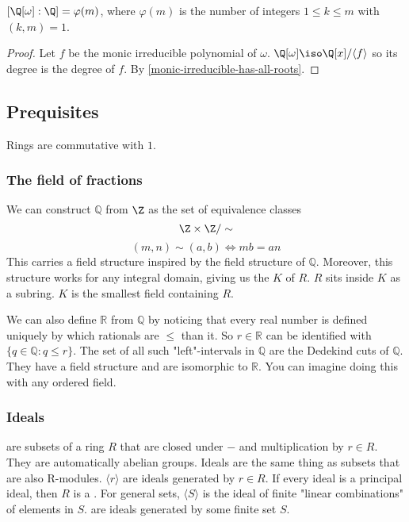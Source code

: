 \begin{corollary}\label{Q[w]-degree}
$[\Q[\omega]:\Q]=\varphi(m)$, where $\varphi(m)$ is the number of integers $1\leq k\leq m$ with $(k,m)=1$.
\end{corollary}

\begin{proof} Let $f$ be the monic irreducible polynomial of $\omega$. $\Q[\omega]\iso \Q[x]/\langle f \rangle$ so its degree is the degree of $f$. By \cref{monic-irreducible-has-all-roots}.
\end{proof}

\subsection{Prequisites}
Rings are commutative with $1$.
\subsubsection{The field of fractions}
We can construct $\mathbb{Q}$ from $\Z$ as the set of equivalence classes $$\Z\times\Z / \sim $$
$$(m,n)\sim (a,b)\iff mb=an$$
This carries a field structure inspired by the field structure of $\mathbb{Q}$. Moreover, this structure works for any integral domain, giving us the  $K$ of $R$. $R$ sits inside $K$ as a subring. $K$ is the smallest field containing $R$.

We can also define $\mathbb{R}$ from $\mathbb{Q}$ by noticing that every real number is defined uniquely by which rationals are $\leq$ than it. So $r\in \mathbb{R}$ can be identified with $\{q\in \mathbb{Q}:q\leq r\}$. The set of all such "left"-intervals in $\mathbb{Q}$ are the Dedekind cuts of $\mathbb{Q}$. They have a field structure and are isomorphic to $\mathbb{R}$. You can imagine doing this with any ordered field.

\subsubsection{Ideals}
 are subsets of a ring $R$ that are closed under $-$ and multiplication by $r\in R$. They are automatically abelian groups. Ideals are the same thing as subsets that are also R-modules.  $\langle r \rangle$ are ideals generated by $r\in R$. If every ideal is a principal ideal, then $R$ is a . For general sets, $\langle S \rangle$ is the ideal of finite "linear combinations" of elements in $S$.  are ideals generated by some finite set $S$.

